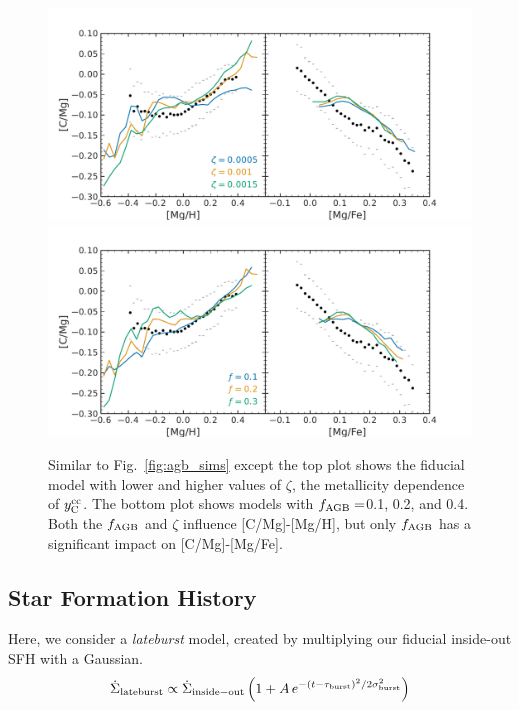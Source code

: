 \documentclass[fleqn,usenatbib]{mnras}
\newcommand{\sfh}{SFH}
\newcommand{\caah}{[C/Mg]-[Mg/H]}
\newcommand{\caafe}{[C/Mg]-[Mg/Fe]}
\newcommand{\Ycc}{\ensuremath{y_{\rm C}^{\rm cc}}}
\begin{document}
\begin{figure}
\centering
\includegraphics{beta.pdf}
\includegraphics{f_agb.pdf}

\caption[Adjusted Yield Models]{Similar to Fig.~\ref{fig:agb_sims} except the top plot shows the fiducial model with lower and higher values of $\zeta$, the metallicity dependence of $\Ycc$. The bottom plot shows models with $f_{\rm AGB}=$0.1, 0.2, and 0.4. Both the $f_{\rm AGB}$ and $\zeta$ influence \caah, but only $f_{\rm AGB}$ has a significant impact on \caafe.}
\label{fig:beta_f}
\end{figure}



\subsection{Star Formation History} \label{sec:sfh}




Here, we consider a \textit{lateburst} model, created by multiplying our fiducial inside-out \sfh{} with a Gaussian.
\begin{equation}\label{eq:lateburst}
    \dot{\Sigma}_{\rm lateburst} \propto \dot{\Sigma}_{\rm inside-out} \left(1 + A\,e^{-(t-\tau_{\rm burst})^2/2\sigma^2_{\rm burst}} \right)
\end{equation}
\end{document}
